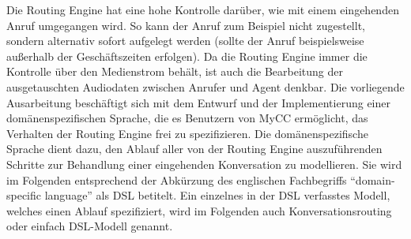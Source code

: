 Die Routing Engine hat eine hohe Kontrolle darüber, wie mit einem eingehenden Anruf umgegangen wird. So kann der Anruf zum Beispiel nicht zugestellt, sondern alternativ sofort aufgelegt werden (sollte der Anruf beispielsweise außerhalb der Geschäftszeiten erfolgen). Da die Routing Engine immer die Kontrolle über den Medienstrom behält, ist auch die Bearbeitung der ausgetauschten Audiodaten zwischen Anrufer und Agent denkbar. Die vorliegende Ausarbeitung beschäftigt sich mit dem Entwurf und der Implementierung einer domänenspezifischen Sprache, die es Benutzern von MyCC ermöglicht, das Verhalten der Routing Engine frei zu spezifizieren. Die domänenspezifische Sprache dient dazu, den Ablauf aller von der Routing Engine auszuführenden Schritte zur Behandlung einer eingehenden Konversation zu modellieren. Sie wird im Folgenden entsprechend der Abkürzung des englischen Fachbegriffs ``domain-specific language'' als DSL betitelt. Ein einzelnes in der DSL verfasstes Modell, welches einen Ablauf spezifiziert, wird im Folgenden auch Konversationsrouting oder einfach DSL-Modell genannt.
 
